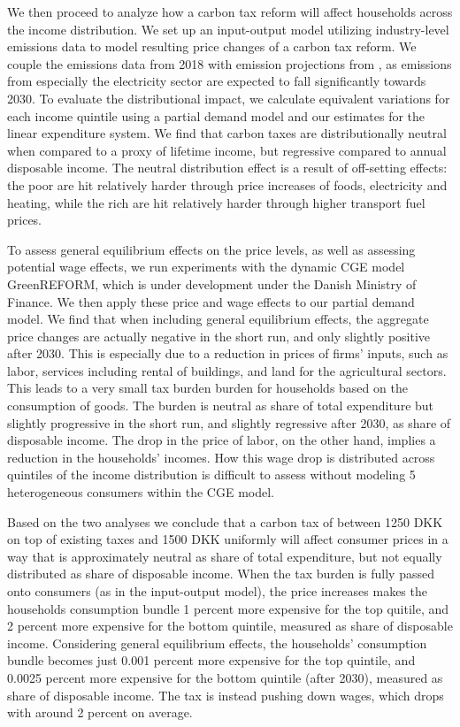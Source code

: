 We then proceed to analyze how a carbon tax reform will affect households across the income distribution. We set up an input-output model utilizing industry-level emissions data to model resulting price changes of a carbon tax reform. We couple the emissions data from 2018 with emission projections from \cite{kf21}, as emissions from especially the electricity sector are expected to fall significantly towards 2030. To evaluate the distributional impact, we calculate equivalent variations for each income quintile using a partial demand model and our estimates for the linear expenditure system. We find that carbon taxes are distributionally neutral when compared to a proxy of lifetime income, but regressive compared to annual disposable income. The neutral distribution effect is a result of off-setting effects: the poor are hit relatively harder through price increases of foods, electricity and heating, while the rich are hit relatively harder through higher transport fuel prices. 

To assess general equilibrium effects on the price levels, as well as assessing potential wage effects, we run experiments with the dynamic CGE model GreenREFORM, which is under development under the Danish Ministry of Finance. We then apply these price and wage effects to our partial demand model. We find that when including general equilibrium effects, the aggregate price changes are actually negative in the short run, and only slightly positive after 2030. This is especially due to a reduction in prices of firms' inputs, such as labor, services including rental of buildings, and land for the agricultural sectors. This leads to a very small tax burden burden for households based on the consumption of goods. The burden is neutral as share of total expenditure but slightly progressive in the short run, and slightly regressive after 2030, as share of disposable income. The drop in the price of labor, on the other hand, implies a reduction in the households' incomes. How this wage drop is distributed across quintiles of the income distribution is difficult to assess without modeling 5 heterogeneous consumers within the CGE model.  

Based on the two analyses we conclude that a carbon tax of between 1250 DKK on top of existing taxes and 1500 DKK uniformly will affect consumer prices in a way that is approximately neutral as share of total expenditure, but not equally distributed as share of disposable income. When the tax burden is fully passed onto consumers (as in the input-output model), the price increases makes the households consumption bundle 1 percent more expensive for the top quitile, and 2 percent more expensive for the bottom quintile, measured as share of disposable income. Considering general equilibrium effects, the households' consumption bundle becomes just 0.001 percent more expensive for the top quintile, and 0.0025 percent more expensive for the bottom quintile (after 2030), measured as share of disposable income. The tax is instead pushing down wages, which drops with around 2 percent on average.

